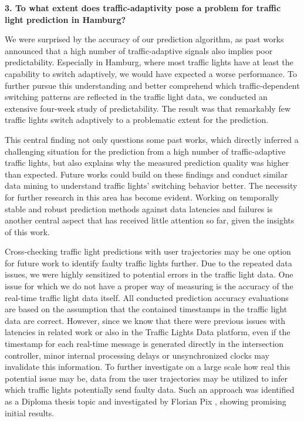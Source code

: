 \textbf{\color{cidarkblue}3. To what extent does traffic-adaptivity pose a problem for traffic light prediction in Hamburg?} 

We were surprised by the accuracy of our prediction algorithm, as past works announced that a high number of traffic-adaptive signals also implies poor predictability. Especially in Hamburg, where most traffic lights have at least the capability to switch adaptively, we would have expected a worse performance. To further pursue this understanding and better comprehend which traffic-dependent switching patterns are reflected in the traffic light data, we conducted an extensive four-week study of predictability. The result was that remarkably few traffic lights switch adaptively to a problematic extent for the prediction. 

This central finding not only questions some past works, which directly inferred a challenging situation for the prediction from a high number of traffic-adaptive traffic lights, but also explains why the measured prediction quality was higher than expected. Future works could build on these findings and conduct similar data mining to understand traffic lights' switching behavior better. The necessity for further research in this area has become evident. Working on temporally stable and robust prediction methods against data latencies and failures is another central aspect that has received little attention so far, given the insights of this work.

Cross-checking traffic light predictions with user trajectories may be one option for future work to identify faulty traffic lights further. Due to the repeated data issues, we were highly sensitized to potential errors in the traffic light data. One issue for which we do not have a proper way of measuring is the accuracy of the real-time traffic light data itself. All conducted prediction accuracy evaluations are based on the assumption that the contained timestamps in the traffic light data are correct. However, since we know that there were previous issues with latencies in related work or also in the Traffic Lights Data platform, even if the timestamp for each real-time message is generated directly in the intersection controller, minor internal processing delays or unsynchronized clocks may invalidate this information. To further investigate on a large scale how real this potential issue may be, data from the user trajectories may be utilized to infer which traffic lights potentially send faulty data. Such an approach was identified as a Diploma thesis topic and investigated by Florian Pix \cite{pix_2024}, showing promising initial results.


